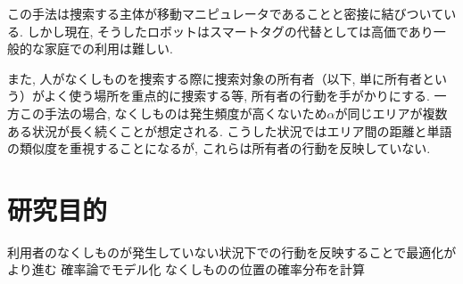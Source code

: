 この手法は捜索する主体が移動マニピュレータであることと密接に結びついている. 
しかし現在, そうしたロボットはスマートタグの代替としては高価であり一般的な家庭での利用は難しい. 

また, 人がなくしものを捜索する際に捜索対象の所有者（以下, 単に所有者という）がよく使う場所を重点的に捜索する等, 所有者の行動を手がかりにする. 
一方この手法の場合, なくしものは発生頻度が高くないため$\alpha$が同じエリアが複数ある状況が長く続くことが想定される. 
こうした状況ではエリア間の距離と単語の類似度を重視することになるが, これらは所有者の行動を反映していない. 

\section{研究目的}
利用者のなくしものが発生していない状況下での行動を反映することで最適化がより進む
確率論でモデル化
なくしものの位置の確率分布を計算

